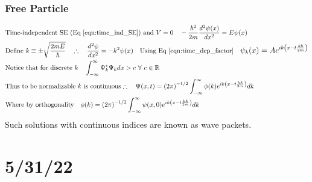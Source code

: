 \documentclass[12pt]{article}
\begin{document}
\subsubsection{Free Particle}
\begin{align}
 &\text{Time-independent SE (Eq \ref{eqn:time_ind_SE}) and }V=0\quad -\frac{\hbar^2}{2m}\frac{d^2\psi(x)}{dx^2}=E\psi(x)\\
 &\text{Define }k\equiv\pm\sqrt{\frac{2mE}{\hbar}}\quad\therefore\quad \frac{d^2\psi}{dx^2}=-k^2\psi(x)\quad\text{Using Eq \ref{eqn:time_dep_factor}}\quad \mathlarger{\psi_k(x)=Ae^{ik\left(x-t\frac{k\hbar}{2m}\right)}}\\
 &\text{Notice that for discrete }k\quad \int_{-\infty}^\infty \Psi_k^*\Psi_kdx>c\ \forall\ c\in\mathbb{R}\\
&\text{Thus to be normalizable }k \text{ is continuous}\therefore\quad \Psi(x,t)=\left(2\pi\right)^{-1/2}\int_{-\infty}^\infty\phi(k)e^{ik\left(x-t\frac{k\hbar}{2m}\right)} dk
\\
&\text{Where by orthogonality}\quad \phi(k)=\left(2\pi\right)^{-1/2}\int_{-\infty}^\infty\psi(x,0)e^{ik\left(x-t\frac{k\hbar}{2m}\right)} dk
\end{align}
Such solutions with continuous indices are known as wave packets.
\section{5/31/22}
\end{document}
